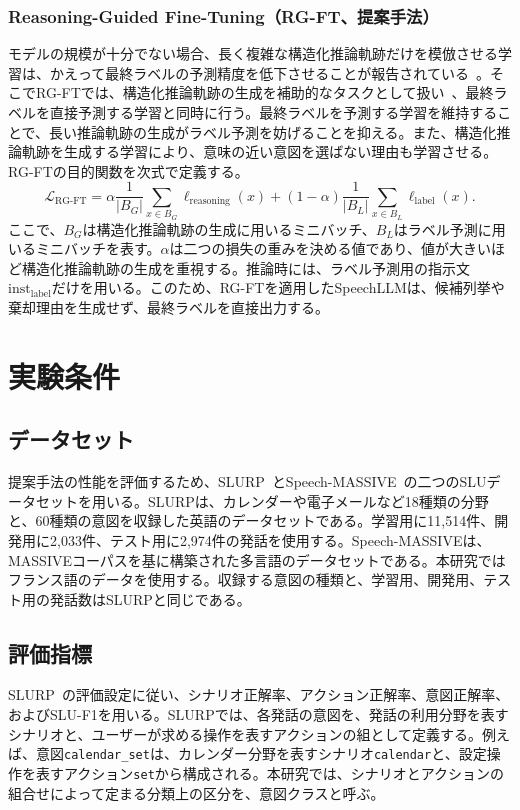 \documentclass[11pt,a4paper]{ltjsarticle}
\begin{document}
\subsubsection{Reasoning-Guided Fine-Tuning（RG-FT、提案手法）}
モデルの規模が十分でない場合、長く複雑な構造化推論軌跡だけを模倣させる学習は、かえって最終ラベルの予測精度を低下させることが報告されている~\cite{li-etal-2025-small-models,chen-etal-2025-unveiling-key,chen-etal-2025-skip}。そこでRG-FTでは、構造化推論軌跡の生成を補助的なタスクとして扱い~\cite{hsieh-etal-2023-distilling}、最終ラベルを直接予測する学習と同時に行う。最終ラベルを予測する学習を維持することで、長い推論軌跡の生成がラベル予測を妨げることを抑える。また、構造化推論軌跡を生成する学習により、意味の近い意図を選ばない理由も学習させる。RG-FTの目的関数を次式で定義する。
\begin{equation}
\mathcal{L}_{\mathrm{RG\mbox{-}FT}}
=\alpha\frac{1}{|B_G|}\sum_{x\in B_G}\ell_{\mathrm{reasoning}}(x)
+(1-\alpha)\frac{1}{|B_L|}\sum_{x\in B_L}\ell_{\mathrm{label}}(x).
\tag{9}
\end{equation}
ここで、$B_G$は構造化推論軌跡の生成に用いるミニバッチ、$B_L$はラベル予測に用いるミニバッチを表す。$\alpha$は二つの損失の重みを決める値であり、値が大きいほど構造化推論軌跡の生成を重視する。推論時には、ラベル予測用の指示文$\mathrm{inst}_{\mathrm{label}}$だけを用いる。このため、RG-FTを適用したSpeechLLMは、候補列挙や棄却理由を生成せず、最終ラベルを直接出力する。

\section{実験条件}
\subsection{データセット}
提案手法の性能を評価するため、SLURP~\cite{bastianelli-etal-2020-slurp}とSpeech-MASSIVE~\cite{lee2024speechmassivemultilingualspeechdataset}の二つのSLUデータセットを用いる。SLURPは、カレンダーや電子メールなど18種類の分野と、60種類の意図を収録した英語のデータセットである。学習用に11,514件、開発用に2,033件、テスト用に2,974件の発話を使用する。Speech-MASSIVEは、MASSIVEコーパスを基に構築された多言語のデータセットである。本研究ではフランス語のデータを使用する。収録する意図の種類と、学習用、開発用、テスト用の発話数はSLURPと同じである。

\subsection{評価指標}
SLURP~\cite{bastianelli-etal-2020-slurp}の評価設定に従い、シナリオ正解率、アクション正解率、意図正解率、およびSLU-F1を用いる。SLURPでは、各発話の意図を、発話の利用分野を表すシナリオと、ユーザーが求める操作を表すアクションの組として定義する。例えば、意図\texttt{calendar\_set}は、カレンダー分野を表すシナリオ\texttt{calendar}と、設定操作を表すアクション\texttt{set}から構成される。本研究では、シナリオとアクションの組合せによって定まる分類上の区分を、意図クラスと呼ぶ。
\end{document}
